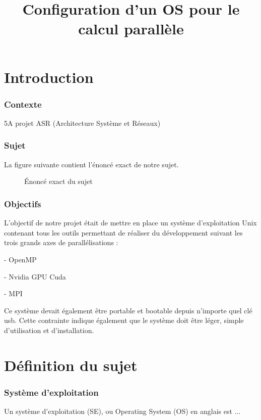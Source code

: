 \documentclass[final]{polytech/polytech}
\title{Configuration d’un OS pour le calcul parallèle}
\begin{document}
\part{Introduction}




\section{Contexte}
5A projet ASR (Architecture Système et Réseaux)

\section{Sujet}
La figure suivante contient l'énoncé exact de notre sujet.

\begin{figure}
	\caption{Énoncé exact du sujet}
	\label{fig:enonce_sujet_projet_asr}
\end{figure}

\section{Objectifs}
L’objectif de notre projet était de mettre en place un système d’exploitation Unix contenant tous les outils permettant de réaliser du développement suivant les trois grands axes de parallélisations :

- OpenMP

- Nvidia GPU Cuda

- MPI

Ce système devait également être portable et bootable depuis n’importe quel clé usb. Cette contrainte indique également que le système doit être léger, simple d’utilisation et d’installation.

\part{Définition du sujet}

\section{Système d'exploitation}
Un système d'exploitation (SE), ou Operating System (OS) en anglais est ...
\end{document}
